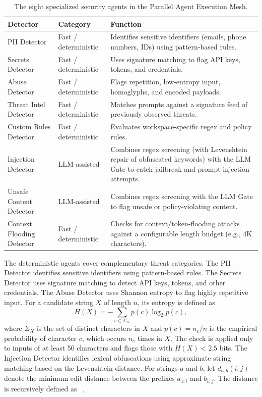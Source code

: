 \documentclass[runningheads]{llncs}
\newif\ifrev
\newcommand{\rev}[1]{\ifrev\hl{#1}\else#1\fi}                  %
\newcommand{\revm}[1]{\ifrev\colorbox{yellow}{$#1$}\else#1\fi} %
\begin{document}
\begin{table}[t]
\centering
\scriptsize
\caption{The eight specialized security agents in the Parallel Agent Execution Mesh.}
\label{tab:detectors}
\begin{tabular}{@{}llp{5.4cm}@{}}
\toprule
\textbf{Detector} & \textbf{Category} & \textbf{Function} \\
\midrule
PII Detector & Fast / deterministic & Identifies sensitive identifiers (emails, phone numbers, IDs) using pattern-based rules. \\
Secrets Detector & Fast / deterministic & \rev{Uses signature matching to flag API keys, tokens, and credentials.} \\
Abuse Detector & Fast / deterministic & \rev{Flags repetition, low-entropy input, homoglyphs, and encoded payloads.} \\
Threat Intel Detector & Fast / deterministic & Matches prompts against a signature feed of previously observed threats. \\
Custom Rules Detector & Fast / deterministic & Evaluates workspace-specific regex and policy rules. \\
Injection Detector & LLM-assisted & Combines regex screening \rev{(with Levenshtein repair of obfuscated keywords)} with the LLM Gate to catch jailbreak and prompt-injection attempts. \\
Unsafe Content Detector & LLM-assisted & Combines regex screening with the LLM Gate to flag unsafe or policy-violating content. \\
Context Flooding Detector & \rev{Fast / deterministic} & Checks for context/token-flooding attacks against a configurable length budget (e.g., 4K characters). \\
\bottomrule
\end{tabular}
\vspace{-5mm}
\end{table}
The deterministic agents cover complementary threat categories. The PII Detector identifies sensitive identifiers using pattern-based rules. The Secrets Detector \rev{uses signature matching to detect API keys, tokens, and other credentials. The Abuse Detector uses Shannon entropy to flag highly repetitive input}. For a candidate string $X$ of length $n$, its entropy is defined as~\cite{Shannon}
\begin{equation}
H(X)=-\revm{\displaystyle\sum_{c\in\Sigma_X}p(c)\log_2 p(c)},
\label{eq:entropy}
\end{equation}
where \rev{$\Sigma_X$ is the set of distinct characters in $X$ and $p(c)=n_c/n$ is the empirical probability of character $c$, which occurs $n_c$ times in $X$.} \rev{The check is applied only to inputs of at least 50 characters and flags those with $H(X)<2.5$ bits.} The \rev{Injection} Detector identifies lexical obfuscations using approximate string matching based on the Levenshtein distance. For strings $a$ and $b$, let $d_{a,b}(i,j)$ denote the minimum edit distance between the prefixes $a_{1:i}$ and $b_{1:j}$. The distance is recursively defined as ~\cite{Levenshtein_recursive},
\end{document}
